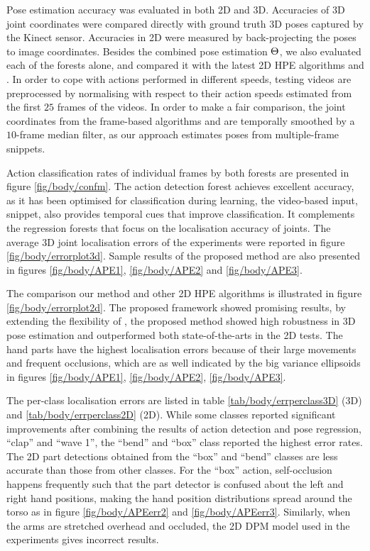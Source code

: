 

Pose estimation accuracy was evaluated in both 2D and 3D. Accuracies of 3D joint coordinates were compared directly with ground truth 3D poses captured by the Kinect sensor. Accuracies in 2D were measured by back-projecting the poses to image coordinates.  
Besides the combined pose estimation $\Theta$, we also evaluated each of the forests alone, and compared it with the latest 2D HPE algorithms \cite{Eichner2012} and \cite{Yang2011}. 
In order to cope with actions performed in different speeds, testing videos are preprocessed by normalising with respect to their action speeds estimated from the first $25$ frames of the videos.
In order to make a fair comparison, the joint coordinates from the frame-based algorithms \cite{Eichner2012} and \cite{Yang2011} are temporally smoothed by a $10$-frame median filter, as our approach estimates poses from multiple-frame snippets. 

Action classification rates of individual frames by both forests are presented in figure \ref{fig/body/confm}. 
The action detection forest achieves excellent accuracy, as it has been optimised for classification during learning, the video-based input, snippet, also provides temporal cues that improve classification. It complements the regression forests that focus on the localisation accuracy of joints.    
The average 3D joint localisation errors of the experiments were reported in figure \ref{fig/body/errorplot3d}. 
Sample results of the proposed method are also presented in figures \ref{fig/body/APE1}, \ref{fig/body/APE2} and \ref{fig/body/APE3}. 

The comparison our method and other 2D HPE algorithms is illustrated in figure \ref{fig/body/errorplot2d}.
The proposed framework showed promising results, by extending the flexibility of \cite{Yang2011}, the proposed method showed high robustness in 3D pose estimation and outperformed both state-of-the-arts in the 2D tests. The hand parts have the highest localisation errors because of their large movements and frequent occlusions, which are as well indicated by the big variance ellipsoids in figures \ref{fig/body/APE1}, \ref{fig/body/APE2}, \ref{fig/body/APE3}.

The per-class localisation errors are listed in table \ref{tab/body/errperclass3D} (3D) and \ref{tab/body/errperclass2D} (2D). While some classes reported significant improvements after combining the results of action detection and pose regression, \eg ``clap'' and ``wave 1'', the ``bend'' and ``box'' class reported the highest error rates.
The 2D part detections obtained from the ``box'' and ``bend'' classes are less accurate than those from other classes.  For the ``box'' action, self-occlusion happens frequently such that the part detector is confused about the left and right hand positions, making the hand position distributions spread around the torso as in figure \ref{fig/body/APEerr2} and \ref{fig/body/APEerr3}. 
Similarly, when the arms are stretched overhead and occluded, the 2D DPM model used in the experiments gives incorrect results.  

